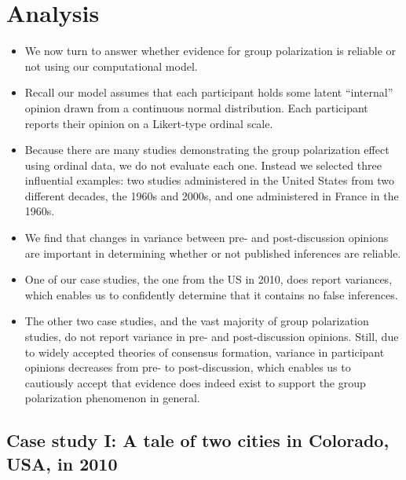 \documentclass[11pt,letterpaper]{article}
\begin{document}
\section{Analysis}

\begin{itemize}
  \item 
    We now turn to answer whether evidence for group polarization is reliable
    or not using our computational model.
  \item
    Recall our model assumes that each participant holds some latent ``internal'' opinion
    drawn from a continuous normal distribution. Each participant reports 
    their opinion on a Likert-type ordinal scale. 
  \item
    Because there are many studies demonstrating the group polarization effect
    using ordinal data, we do not evaluate each one. Instead we selected 
    three influential examples: two studies administered in the United States
    from two different decades, the 1960s and 2000s, and one administered in 
    France in the 1960s.
  \item
    We find that changes in variance between pre- and post-discussion opinions
    are important in determining whether or not published inferences are reliable.
  \item
    One of our case studies, the one from the US in 2010, does report variances,
    which enables us to confidently determine that it contains no false inferences.
  \item
    The other two case studies, and the vast majority of group polarization
    studies, do not report variance in pre- and post-discussion opinions.
    Still, due to widely accepted theories of consensus formation, variance
    in participant opinions decreases from pre- to post-discussion, which 
    enables us to cautiously accept that evidence does indeed exist to support
    the group polarization phenomenon in general.
\end{itemize}

\subsection{Case study I: A tale of two cities in Colorado, USA, in 2010}
\end{document}
